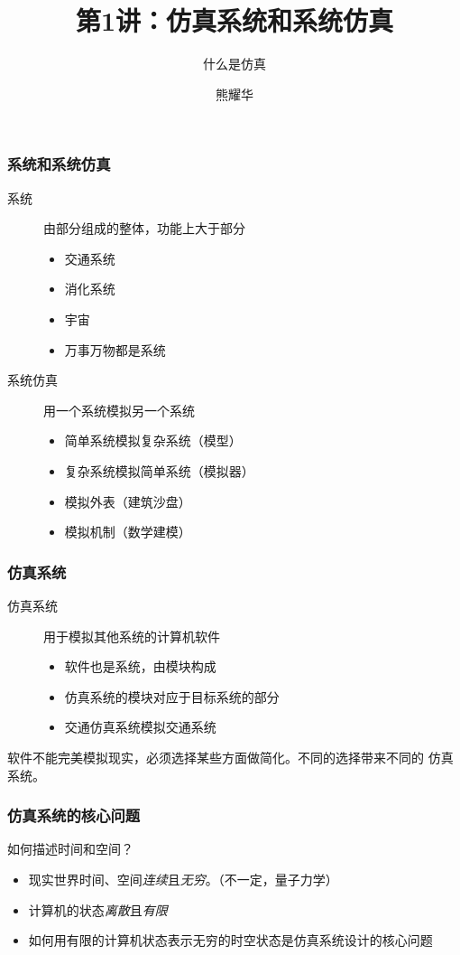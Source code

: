 \documentclass[14pt]{beamer}
\title{第1讲：仿真系统和系统仿真}
\subtitle{什么是仿真}
\author{熊耀华}
\institute{交通工程系}
\begin{document}
\begin{frame}
    \titlepage
\end{frame}

\begin{frame}
    \frametitle{系统和系统仿真}
    \begin{description}
        \item[系统] 由部分组成的整体，功能上大于部分
        \begin{itemize}
            \item 交通系统
            \item 消化系统
            \item 宇宙
            \item 万事万物都是系统
        \end{itemize}
        \item[系统仿真] 用一个系统模拟另一个系统
        \begin{itemize}
            \item 简单系统模拟复杂系统（模型）
            \item 复杂系统模拟简单系统（模拟器）
            \item 模拟外表（建筑沙盘）
            \item 模拟机制（数学建模）
        \end{itemize}
    \end{description}
\end{frame}

\begin{frame}
    \frametitle{仿真系统}
    \begin{description}
        \item[仿真系统] 用于模拟其他系统的计算机软件
        \begin{itemize}
            \item 软件也是系统，由模块构成
            \item 仿真系统的模块对应于目标系统的部分
            \item 交通仿真系统模拟交通系统
        \end{itemize}
    \end{description}
    软件不能完美模拟现实，必须选择某些方面做简化。不同的选择带来不同的
    仿真系统。
\end{frame}

\begin{frame}
    \frametitle{仿真系统的核心问题}
    如何描述时间和空间？
    \begin{itemize}
        \item 现实世界时间、空间\emph{连续}且\emph{无穷}。（不一定，量子力学）
        \item 计算机的状态\emph{离散}且\emph{有限}
        \item 如何用有限的计算机状态表示无穷的时空状态是仿真系统设计的核心问题
    \end{itemize}
\end{frame}
\end{document}
